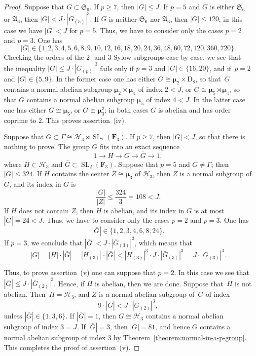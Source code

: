\documentclass[12pt]{amsart}
\numberwithin{equation}{section}
\theoremstyle{definition}
\newcommand{\mumu}{\boldsymbol{\mu}}
\newcommand{\DD}{\mathrm D}
\newcommand{\HHH}{\mathscr{H}}
\DeclareMathOperator{\SL}{SL}
\def \ge {\geqslant}
\def \le {\leqslant}
\begin{document}
\begin{proof}
Suppose that $G\subset\mathfrak{S}_6$.
If $p\ge 7$, then $|G|\le J$. If $p=5$ and $G$ is either $\mathfrak{S}_6$ or $\mathfrak{A}_6$,
then $|G|<J\cdot |G_{(5)}|^3$. If $G$ is neither $\mathfrak{S}_6$ nor $\mathfrak{A}_6$,
then $|G|\le 120$; in this case we have $|G|< J$ for $p=5$.
Thus, we have to consider only the cases $p=2$ and $p=3$.
One has
$$
|G|\in\{1,2,3,4,5,6,8,9,10,12,16,18,20,24,36,48,60,72,120,360,720\}.
$$
Checking the orders of the $2$- and $3$-Sylow subgroups case by case, we see that the
inequality $|G|\le J\cdot |G_{(p)}|^3$ fails only if $p=3$ and $|G|\in\{16,20\}$,
and if~\mbox{$p=2$} and $|G|\in\{5,9\}$. In the former case one has either $G\cong \mumu_2\times\DD_8$,
so that~$G$ contains a normal abelian subgroup $\mumu_2\times\mumu_4$ of index $2<J$,
or $G\cong \mumu_5\rtimes\mumu_4$, so that $G$ contains a normal abelian subgroup $\mumu_5$ of index $4<J$. In the latter case one has either $G\cong \mumu_5$, or $G\cong \mumu_3^2$;
in both cases $G$ is abelian and has order coprime to $2$.
This proves assertion~(iv).

Suppose that $G\subset \Gamma\cong\HHH_3\rtimes\SL_2(\mathbf{F}_3)$.
If $p\ge 7$, then $|G|<J$, so that there is nothing to prove.
The group $G$ fits into
an exact sequence
$$
1\to H\to G\to\bar{G}\to 1,
$$
where $H\subset \HHH_3$ and $\bar{G}\subset\SL_2(\mathbf{F}_3)$.
Suppose that $p=5$ and $G\neq \Gamma$; then~\mbox{$|G|\le 324$}.
If $H$ contains the center $Z\cong\mumu_3$ of $\HHH_3$, then $Z$ is a normal subgroup
of $G$, and its index in $G$ is
$$
\frac{|G|}{|Z|}\le \frac{324}{3}=108<J.
$$
If $H$ does not contain $Z$, then $H$ is abelian, and its index in $G$
is at most~\mbox{$|\bar{G}|=24<J$}. Thus, we have to consider only the cases $p=2$ and $p=3$.
One has
$$
|\bar{G}|\in\{1,2,3,4,6,8,24\}.
$$
If $p=3$, we conclude that $|\bar{G}|<J\cdot |\bar{G}_{(3)}|^3$, which means that
$$
|G|=|H|\cdot |\bar{G}|=|H_{(3)}|\cdot |\bar{G}|<|H_{(3)}|^3\cdot J\cdot |\bar{G}_{(3)}|^3=
J\cdot |G_{(3)}|^3.
$$

Thus, to prove assertion~(v) one can suppose that $p=2$. In this case we see that
$|\bar{G}|\le J\cdot |\bar{G}_{(2)}|^3$. Hence, if $H$ is abelian, then
we are done. Suppose that~$H$ is not abelian.
Then~\mbox{$H=\HHH_3$}, and $Z$ is a normal abelian subgroup of~$G$ of index
$$
9\cdot |\bar{G}|<J\cdot |\bar{G}_{(2)}|^3,
$$
unless $|\bar{G}|\in\{1,3,6\}$. If $|\bar{G}|=1$, then $G\cong \HHH_3$ contains a normal
abelian subgroup of index $3=J$. If $|\bar{G}|=3$, then $|G|=81$, and hence
$G$ contains a normal abelian subgroup of index $3$ by Theorem~\ref{theorem:normal-in-a-p-group}.
This completes the proof of assertion~(v).


\end{proof}
\end{document}

